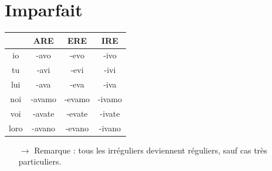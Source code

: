 \documentclass[12pt, openany]{report}
\begin{document}
\section{Imparfait}
\begin{center}
    \begin{tabular}{c|c|c|c}
        & ARE & ERE & IRE\\ \hline
        io & -avo & -evo & -ivo\\
        tu & -avi & -evi & -ivi\\
        lui & -ava & -eva & -iva\\
        noi & -avamo & -evamo & -ivamo\\
        voi & -avate & -evate & -ivate\\
        loro & -avano & -evano & -ivano\\
    \end{tabular}
\end{center}
\begin{itemize}
    \item [$\rightarrow$] Remarque : tous les irréguliers deviennent réguliers, sauf cas très particuliers.
\end{itemize}
\end{document}
